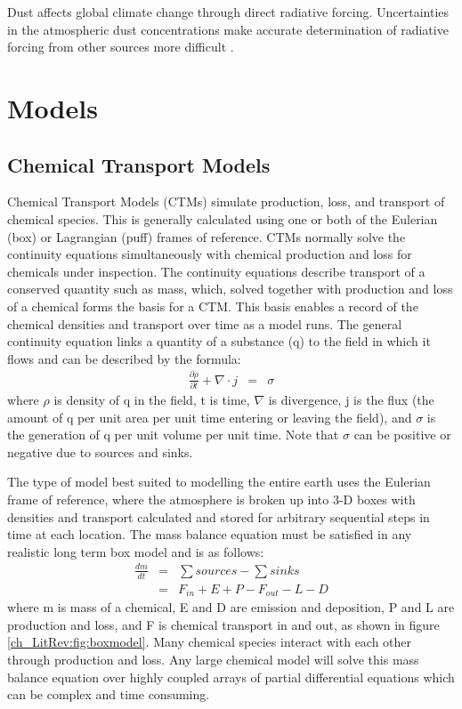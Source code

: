   Dust affects global climate change through direct radiative forcing.
  Uncertainties in the atmospheric dust concentrations make accurate determination of radiative forcing from other sources more difficult \citep{IPCC_2013_chap8}.


\section{Models}
\label{ch_LitRev:sec:models}

  \subsection{Chemical Transport Models}
  
    Chemical Transport Models (CTMs) simulate production, loss, and transport of chemical species.
    This is generally calculated using one or both of the Eulerian (box) or Lagrangian (puff) frames of reference.
    CTMs normally solve the continuity equations simultaneously with chemical production and loss for chemicals under inspection. 
    The continuity equations describe transport of a conserved quantity such as mass, which, solved together with production and loss of a chemical forms the basis for a CTM.
    This basis enables a record of the chemical densities and transport over time as a model runs.
    The general continuity equation links a quantity of a substance (q) to the field in which it flows and can be described by the formula:
    \begin{eqnarray*}
	\frac{\partial \rho}{\partial t} + \nabla \cdot j &=& \sigma 
    \end{eqnarray*}
    where $\rho$ is density of q in the field, t is time, $\nabla$ is divergence, j is the flux (the amount of q per unit area per unit time entering or leaving the field), and $\sigma$ is the generation of q per unit volume per unit time.
    Note that $\sigma$ can be positive or negative due to sources and sinks.

    The type of model best suited to modelling the entire earth uses the Eulerian frame of reference, where the atmosphere is broken up into 3-D boxes with densities and transport calculated and stored for arbitrary sequential steps in time at each location.
    The mass balance equation must be satisfied in any realistic long term box model and is as follows: 
    \begin{align*}
	\frac{dm}{dt} &=& \sum{sources}-\sum{sinks} \\
	&=& F_{in} + E + P - F_{out} - L - D 
    \end{align*}
    where m is mass of a chemical, E and D are emission and deposition, P and L are production and loss, and F is chemical transport in and out, as shown in figure \ref{ch_LitRev:fig:boxmodel}.
    Many chemical species interact with each other through production and loss. 
    Any large chemical model will solve this mass balance equation over highly coupled arrays of partial differential equations which can be complex and time consuming.

